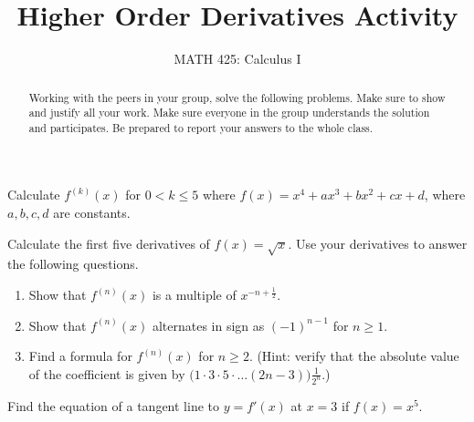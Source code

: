 \documentclass{ximera}
\title{Higher Order Derivatives Activity}
\author{MATH 425: Calculus I}
\begin{document}
\begin{abstract}
    Working with the peers in your group, solve the following problems. Make sure to show and justify all your work. Make sure everyone in the group understands the solution and participates. Be prepared to report your answers to the whole class. 
\end{abstract}
\maketitle


\begin{exercise}
    Calculate $f^{(k)}(x)$ for $0<k\leq 5$ where $f(x)=x^4+ax^3+bx^2+cx+d$, where $a,b,c,d$ are constants.
\end{exercise}


\begin{exercise}
    Calculate the first five derivatives of $f(x)=\sqrt{x}$.  Use your derivatives to answer the following questions.
        \begin{enumerate}
            \item Show that $f^{(n)}(x)$ is a multiple of $x^{-n+\frac12}$.
            \item Show that $f^{(n)}(x)$ alternates in sign as $(-1)^{n-1}$ for $n\geq 1$.
            \item Find a formula for $f^{(n)}(x)$ for $n\geq 2$.  (Hint: verify that the absolute value of the coefficient is given by $\big(1\cdot3\cdot5\cdot \dots(2n-3)\big)\frac{1}{2^n}$.)
        \end{enumerate}
\end{exercise}

\begin{exercise}
    Find the equation of a tangent line to $y=f'(x)$ at $x=3$ if $f(x)=x^5$.
\end{exercise}
\end{document}
